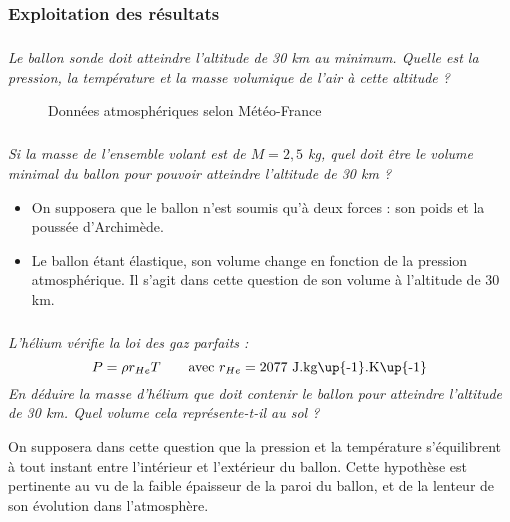 \documentclass[10pt]{article}
\begin{document}
\subsubsection*{Exploitation des résultats}

\subparagraph{}
\textit{Le ballon sonde doit atteindre l'altitude de 30 km au minimum. Quelle est la pression, la température et la masse volumique de l'air à cette altitude ?}

\begin{figure}
\centering
\caption{Données atmosphériques selon Météo-France}\label{fig:meteo-france}
\end{figure} 

\subparagraph{}
\textit{Si la masse de l'ensemble volant est de $M=2,5$ kg, quel doit être le volume minimal du ballon pour pouvoir atteindre l'altitude de 30 km ? }

\begin{rem}
\begin{itemize}
\item On supposera que le ballon n'est soumis qu'à deux forces : son poids et la poussée d'Archimède.
\item Le ballon étant élastique, son volume change en fonction de la pression atmosphérique. Il s'agit dans cette question de son volume à l'altitude de 30 km.
\end{itemize}
\end{rem}

\subparagraph{}
\textit{L'hélium vérifie la loi des gaz parfaits : \[P=\rho r_{He} T \qquad \text{avec } r_{He}=2077\text{ J.kg\up{-1}.K\up{-1}}\]
En déduire la masse d'hélium que doit contenir le ballon pour atteindre l'altitude de 30 km. \newline Quel volume cela représente-t-il au sol ?}

\begin{rem}
On supposera dans cette question que la pression et la température s'équilibrent à tout instant entre l'intérieur et l'extérieur du ballon. Cette hypothèse est pertinente au vu de la faible épaisseur de la paroi du ballon, et de la lenteur de son évolution dans l'atmosphère.
\end{rem}
\end{document}
